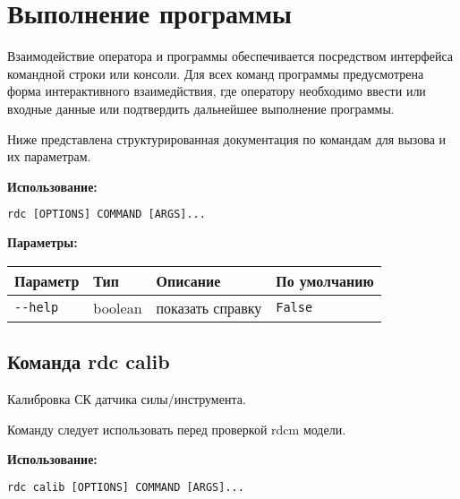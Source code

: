 \newpage
\section{Выполнение программы}

Взаимодействие оператора и программы обеспечивается посредством интерфейса командной строки или консоли.
Для всех команд программы предусмотрена форма интерактивного взаимедйствия, где оператору необходимо ввести или входные данные или подтвердить дальнейшее выполнение программы.

Ниже представлена структурированная документация по командам для вызова и их параметрам.

\textbf{Использование:}
\begin{lstlisting}[language=python, numbers=none, frame=single]
    rdc [OPTIONS] COMMAND [ARGS]...
\end{lstlisting}

\textbf{Параметры:}
\begin{center}
\fontsize{10pt}{10pt}\selectfont
\begin{longtable}[]{p{5cm}|p{2cm}|p{3.5cm}|p{5cm}}
    \hline
\toprule()
Параметр & Тип & Описание & По умолчанию \\
\hline
\midrule()
\endhead
\texttt{-\/-help} & boolean & показать справку &
\texttt{False} \\
\bottomrule()
\hline
\end{longtable}
\end{center}

\hypertarget{rdc-calib}{%
\subsection{Команда rdc calib}\label{rdc-calib}}

Калибровка СК датчика силы/инструмента.

Команду следует использовать перед проверкой rdcm модели.

\textbf{Использование:}
\begin{lstlisting}[language=python, numbers=none, frame=single]
rdc calib [OPTIONS] COMMAND [ARGS]...
\end{lstlisting}

